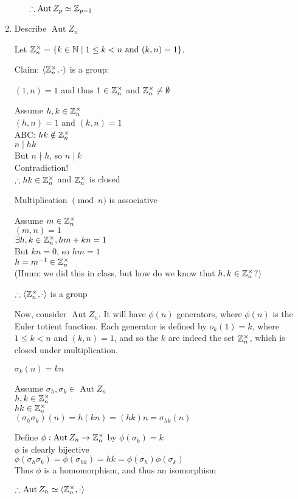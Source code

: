 \documentclass[letterpaper,12pt,fleqn]{article}
\newcommand{\p}{\phi}
\newcommand{\bas}[2]{\left<#1,#2\right>}
\newcommand{\aut}[1]{\operatorname{Aut}{#1}}
\renewcommand{\o}{\sigma}
\newcommand{\iso}{\simeq}
\newcommand{\znx}{\Z_n^{\times}}
\begin{document}
\begin{enumerate}[label=\alph*)]
\begin{enumerate}[label=\arabic*)]
    $\therefore\aut{Z_p}\iso\Z_{p-1}$
    
  \end{enumerate}

\item Describe $\aut{Z_n}$

  Let $\znx=\{k\in\N\mid1\le k<n\ \mbox{and}\ (k,n)=1\}$.

  Claim: $\bas{\znx}{\cdot}$ is a group:

  $(1,n)=1$ and thus $1\in\znx$ and $\znx\ne\emptyset$

  Assume $h,k\in\znx$ \\
  $(h,n)=1$ and $(k,n)=1$ \\
  ABC: $hk\notin\znx$ \\
  $n\mid hk$ \\
  But $n\nmid h$, so $n\mid k$ \\
  Contradiction! \\
  $\therefore hk\in\znx$ and $\znx$ is closed

  Multiplication $\pmod n$ is associative

  Assume $m\in\znx$ \\
  $(m,n)=1$ \\
  $\exists h,k\in\znx,hm+kn=1$ \\
  But $kn=0$, so $hm=1$ \\
  $h=m^{-1}\in\znx$ \\
  (Hmm: we did this in class, but how do we know that $h,k\in\znx$?)

  $\therefore\bas{\znx}{\cdot}$ is a group

  Now, consider $\aut{Z_n}$. It will have $\p(n)$ generators, where $\p(n)$ is
  the Euler totient function. Each generator is defined by $o_k(1)=k$, where
  $1\le k<n$ and $(k,n)=1$, and so the $k$ are indeed the set $\znx$, which is
  closed under multiplication.

  $\o_k(n)=kn$

  Assume $\o_h,\o_k\in\aut{Z_n}$ \\
  $h,k\in\znx$ \\
  $hk\in\znx$ \\
  $(\o_h\o_k)(n)=h(kn)=(hk)n=\o_{hk}(n)$

  Define $\p:\aut{Z_n}\to\znx$ by $\p(\o_k)=k$ \\
  $\p$ is clearly bijective \\
  $\p(\o_h\o_k)=\p(\o_{hk})=hk=\p(\o_h)\p(\o_k)$ \\
  Thus $\p$ is a homomorphism, and thus an isomorphism

  $\therefore\aut{Z_n}\iso\bas{\znx}{\cdot}$
\end{enumerate}
\end{document}
